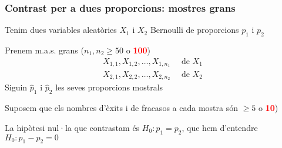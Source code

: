 \documentclass[12pt,t]{beamer}\usepackage[]{graphicx}\usepackage[]{color}
\newcommand{\red}[1]{\textcolor{red}{#1}}
\renewcommand{\emph}[1]{{\color{red}#1}}
\renewcommand{\geq}{\geqslant}
\theoremstyle{plain}
\theoremstyle{definition}
\begin{document}
\begin{frame}
\frametitle{Contrast per a dues proporcions: mostres grans}

Tenim dues variables aleatòries $X_1$ i $X_2$ Bernoulli de proporcions  $p_1$ i $p_2$
\medskip

Prenem m.a.s. \emph{grans} ($n_1,n_2\geq 50$ o \red{\bf 100})
$$
\begin{array}{l}
X_{1,1}, X_{1,2},\ldots, X_{1,n_1}\quad\mbox{ de }X_1\\
X_{2,1}, X_{2,2},\ldots, X_{2,n_2}\quad\mbox{ de }X_2
\end{array}
$$
Siguin $\widehat{p}_1$ i $\widehat{p}_2$  les seves proporcions mostrals
\medskip

Suposem que els nombres d'èxits i de fracasos a cada mostra són $\geq 5$ o \red{\bf 10})
\medskip


La hipòtesi nul·la que contrastam és $H_0: p_1=p_2$, que hem d'entendre $H_0: p_1-p_2=0$
\end{frame}
\end{document}
